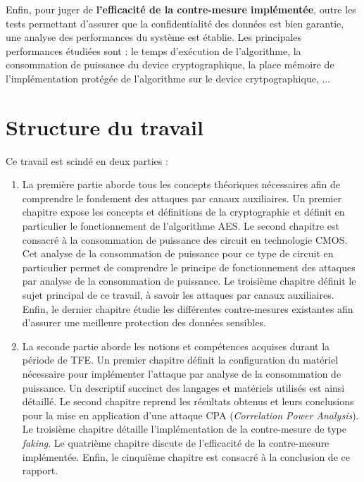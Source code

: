 \documentclass[oneside]{book}
\begin{document}
\newpage
Enfin, pour juger de \textbf{l'efficacité de la contre-mesure implémentée}, outre les tests permettant d'assurer que la confidentialité des données est bien garantie, une analyse des performances du système est établie. Les principales performances étudiées sont : le temps d'exécution de l'algorithme, la consommation de puissance du device cryptographique, la place mémoire de l'implémentation protégée de l'algorithme sur le device crytpographique, ...

\section{Structure du travail}

\hspace{-0.5cm}Ce travail est scindé en deux parties : 
\begin{enumerate}
\item La première partie aborde tous les concepts théoriques nécessaires afin de comprendre le fondement des attaques par canaux auxiliaires. Un premier chapitre expose les concepts et définitions de la cryptographie et définit en particulier le fonctionnement de l'algorithme AES. Le second chapitre est consacré à la consommation de puissance des circuit en technologie CMOS. Cet analyse de la consommation de puissance pour ce type de circuit en particulier permet de comprendre le principe de fonctionnement des attaques par analyse de la consommation de puissance. Le troisième chapitre définit le sujet principal de ce travail, à savoir les attaques par canaux auxiliaires. Enfin, le dernier chapitre étudie les différentes contre-mesures existantes afin d'assurer une meilleure protection des données sensibles. 
\item La seconde partie aborde les notions et compétences acquises durant la période de TFE. Un premier chapitre définit la configuration du matériel nécessaire pour implémenter l'attaque par analyse de la consommation de puissance. Un descriptif succinct des langages et matériels utilisés est ainsi détaillé. Le second chapitre reprend les résultats obtenus et leurs conclusions pour la mise en application d'une attaque CPA (\textit{Correlation Power Analysis}). Le troisième chapitre détaille l'implémentation de la contre-mesure de type \textit{faking}. Le quatrième chapitre discute de l'efficacité de la contre-mesure implémentée. Enfin, le cinquième chapitre est consacré à la conclusion de ce rapport.
\end{enumerate}
\end{document}
